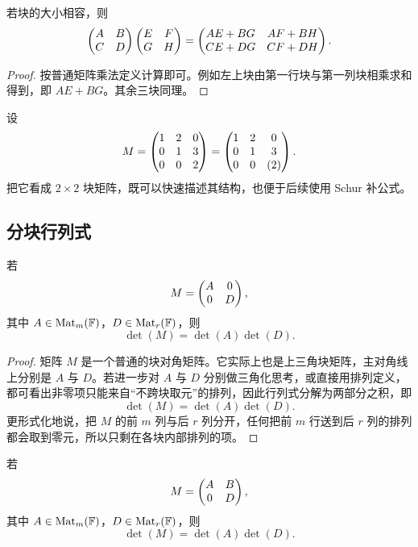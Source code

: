 \begin{proposition}[分块乘法]
若块的大小相容，则
\[
\begin{pmatrix} A&B\\C&D \end{pmatrix}
\begin{pmatrix} E&F\\G&H \end{pmatrix}
=
\begin{pmatrix} AE+BG&AF+BH\\CE+DG&CF+DH \end{pmatrix}.
\]
\end{proposition}

\begin{proof}
按普通矩阵乘法定义计算即可。例如左上块由第一行块与第一列块相乘求和得到，即 $AE+BG$。其余三块同理。
\end{proof}

\begin{example}
设
\[
M=\begin{pmatrix} 1&2&0\\0&1&3\\0&0&2 \end{pmatrix}
=\begin{pmatrix} \begin{matrix}1&2\\0&1\end{matrix}&\begin{matrix}0\\3\end{matrix}\\
\begin{matrix}0&0\end{matrix}&(2) \end{pmatrix}.
\]
把它看成 $2\times 2$ 块矩阵，既可以快速描述其结构，也便于后续使用 Schur 补公式。
\end{example}

\subsection{分块行列式}

\begin{proposition}[分块对角矩阵]
若
\[
M=\begin{pmatrix} A&0\\0&D \end{pmatrix},
\]
其中 $A\in\mathrm{Mat}_m(\mathbb{F})$，$D\in\mathrm{Mat}_r(\mathbb{F})$，则
\[
\det(M)=\det(A)\det(D).
\]
\end{proposition}

\begin{proof}
矩阵 $M$ 是一个普通的块对角矩阵。它实际上也是上三角块矩阵，主对角线上分别是 $A$ 与 $D$。若进一步对 $A$ 与 $D$ 分别做三角化思考，或直接用排列定义，都可看出非零项只能来自“不跨块取元”的排列，因此行列式分解为两部分之积，即
\[
\det(M)=\det(A)\det(D).
\]
更形式化地说，把 $M$ 的前 $m$ 列与后 $r$ 列分开，任何把前 $m$ 行送到后 $r$ 列的排列都会取到零元，所以只剩在各块内部排列的项。
\end{proof}

\begin{proposition}[块上三角矩阵]
若
\[
M=\begin{pmatrix} A&B\\0&D \end{pmatrix},
\]
其中 $A\in\mathrm{Mat}_m(\mathbb{F})$，$D\in\mathrm{Mat}_r(\mathbb{F})$，则
\[
\det(M)=\det(A)\det(D).
\]
\end{proposition}

